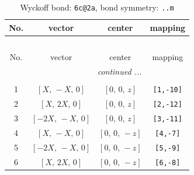 \documentclass[fleqn,8pt]{jsarticle}
\begin{document}
\renewcommand{\arraystretch}{1.2}
\begin{longtable}{cccc}
\caption{Wyckoff bond: {\tt 6c@2a}, bond symmetry: {\tt ..m}}
 \\
 \hline \hline
No. & vector & center & mapping \\ \hline \endfirsthead

\multicolumn{3}{l}{\tablename\ \thetable{}} \\
 \hline \hline
No. & vector & center & mapping \\ \hline \endhead

 \hline \hline
\multicolumn{3}{r}{\footnotesize\it continued ...} \\ \endfoot

 \hline \hline
\multicolumn{3}{r}{} \\ \endlastfoot

1 & $\left[ X,\, - X,\, 0 \right]$ & $\left[ 0,\, 0,\, z \right]$ & {\tt [1,-10]} \\ \hline
2 & $\left[ X,\, 2 X,\, 0 \right]$ & $\left[ 0,\, 0,\, z \right]$ & {\tt [2,-12]} \\ \hline
3 & $\left[ - 2 X,\, - X,\, 0 \right]$ & $\left[ 0,\, 0,\, z \right]$ & {\tt [3,-11]} \\ \hline
4 & $\left[ X,\, - X,\, 0 \right]$ & $\left[ 0,\, 0,\, - z \right]$ & {\tt [4,-7]} \\ \hline
5 & $\left[ - 2 X,\, - X,\, 0 \right]$ & $\left[ 0,\, 0,\, - z \right]$ & {\tt [5,-9]} \\ \hline
6 & $\left[ X,\, 2 X,\, 0 \right]$ & $\left[ 0,\, 0,\, - z \right]$ & {\tt [6,-8]} \\
\end{longtable}
\renewcommand{\arraystretch}{1.2}
\end{document}
